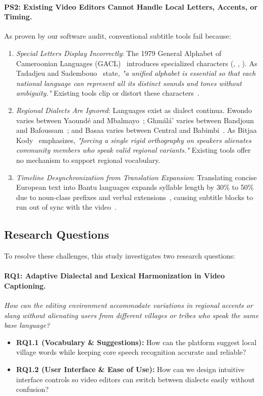 \documentclass[a4paper,11pt]{article}
\begin{document}
\paragraph{\textbf{PS2: Existing Video Editors Cannot Handle Local Letters, Accents, or Timing.}}
As proven by our software audit, conventional subtitle tools fail because:
\begin{enumerate}
    \item \textit{Special Letters Display Incorrectly}: The 1979 General Alphabet of Cameroonian Languages (GACL)~\cite{tadadjeu1979alphabet} introduces specialized characters (\textopeno, \textschwa, \textipa{\ng}). As Tadadjeu and Sadembouo~\cite{tadadjeu1979alphabet} state, \textit{"a unified alphabet is essential so that each national language can represent all its distinct sounds and tones without ambiguity."} Existing tools clip or distort these characters~\cite{w3c2019webvtt}.
    \item \textit{Regional Dialects Are Ignored}: Languages exist as dialect continua. Ewondo varies between Yaound\'e and Mbalmayo~\cite{essono2010ewondo, redden2018ewondo}; Gh\textopeno m\'al\'a' varies between Bandjoun and Bafoussam~\cite{kamga2021phonetic}; and Basaa varies between Central and Babimbi~\cite{bitjaa2017dialectologie}. As Bitjaa Kody~\cite{bitjaa2017dialectologie} emphasizes, \textit{"forcing a single rigid orthography on speakers alienates community members who speak valid regional variants."} Existing tools offer no mechanism to support regional vocabulary.
    \item \textit{Timeline Desynchronization from Translation Expansion}: Translating concise European text into Bantu languages expands syllable length by 30\% to 50\% due to noun-class prefixes and verbal extensions~\cite{abega2012langues}, causing subtitle blocks to run out of sync with the video~\cite{won2025endtoend}.
\end{enumerate}


\subsection{Research Questions}
\label{sec:intro:rq}

To resolve these challenges, this study investigates two research questions:

\paragraph{\textbf{RQ1: Adaptive Dialectal and Lexical Harmonization in Video Captioning.}}
\textit{How can the editing environment accommodate variations in regional accents or slang without alienating users from different villages or tribes who speak the same base language?}
\begin{itemize}
    \item \textbf{RQ1.1 (Vocabulary \& Suggestions):} How can the platform suggest local village words while keeping core speech recognition accurate and reliable?
    \item \textbf{RQ1.2 (User Interface \& Ease of Use):} How can we design intuitive interface controls so video editors can switch between dialects easily without confusion?
\end{itemize}
\end{document}
